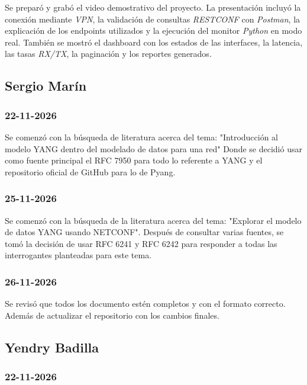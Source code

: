 \documentclass[12pt,a4paper]{article}
\begin{document}
Se preparó y grabó el video demostrativo del proyecto. La presentación incluyó la conexión mediante \textit{VPN}, la validación de consultas \textit{RESTCONF} con \textit{Postman}, la explicación de los endpoints utilizados y la ejecución del monitor \textit{Python} en modo real. También se mostró el dashboard con los estados de las interfaces, la latencia, las tasas \textit{RX/TX}, la paginación y los reportes generados.

\subsection{Sergio Marín}

\subsubsection{22-11-2026}

Se comenzó con la búsqueda de literatura acerca del tema: "Introducción al modelo YANG dentro del modelado de datos para una red"
Donde se decidió usar como fuente principal el RFC 7950 para todo lo referente a YANG y el repositorio oficial de GitHub para lo de Pyang.

\subsubsection{25-11-2026}

Se comenzó con la búsqueda de la literatura acerca del tema: "Explorar el modelo de datos YANG usando NETCONF".
Después de consultar varias fuentes, se tomó la decisión de usar RFC 6241 y RFC 6242 para responder a todas las interrogantes planteadas para este tema.

\subsubsection{26-11-2026}

Se revisó que todos los documento estén completos y con el formato correcto. Además de actualizar el repositorio con los cambios finales.

\subsection{Yendry Badilla}

\subsubsection{22-11-2026}
\end{document}
